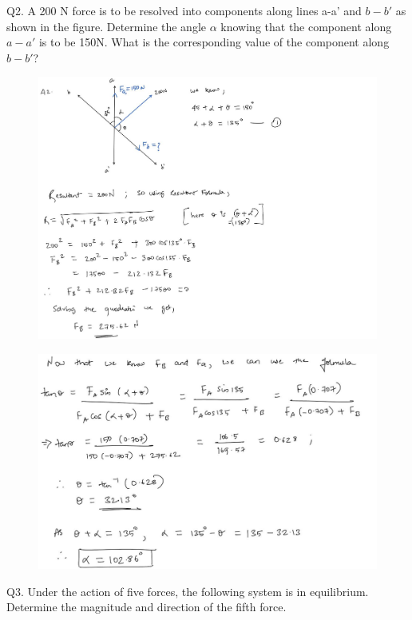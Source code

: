\documentclass[11pt]{article}
\begin{document}
\pagebreak
Q2. A 200 N force is to be resolved into components along lines a-a' and $ b-b' $ as shown in the figure. Determine the angle $\alpha$ knowing that the component along $ a-a' $ is to be 150N. What is the corresponding value of the component along $ b-b' $?
\begin{figure}[H]
	\includegraphics[scale=0.5]{a2.jpg}
	\label{fig: Polygon Law}
\end{figure}
\pagebreak
\begin{figure}[H]
	\includegraphics[scale=0.4]{a22.jpg}
	\label{fig: Polygon Law}
\end{figure}

\pagebreak

Q3. Under the action of five forces, the following system is in equilibrium. Determine the magnitude and direction of the fifth force. 
\end{document}
